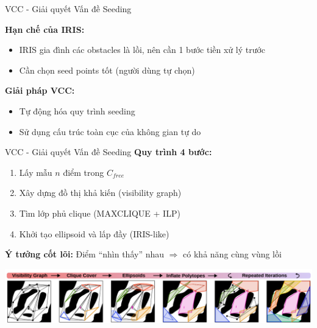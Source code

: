 \documentclass[aspectratio=169]{beamer}
\begin{document}
\begin{frame}{VCC - Giải quyết Vấn đề Seeding}

    \textbf{Hạn chế của IRIS:}
    \begin{itemize}
        \item IRIS gia đình các obstacles là lồi, nên cần 1 bước tiền xử lý trước
        \item Cần chọn seed points tốt (người dùng tự chọn)
    \end{itemize}

    \vspace{1em}
    \textbf{Giải pháp VCC:}
    \begin{itemize}
        \item Tự động hóa quy trình seeding
        \item Sử dụng cấu trúc toàn cục của không gian tự do
    \end{itemize}

\end{frame}

\begin{frame}{VCC - Giải quyết Vấn đề Seeding}
    \textbf{Quy trình 4 bước:}
    \begin{enumerate}
        \item Lấy mẫu $n$ điểm trong $C_{free}$
        \item Xây dựng đồ thị khả kiến (visibility graph)
        \item Tìm lớp phủ clique (MAXCLIQUE + ILP)
        \item Khởi tạo ellipsoid và lấp đầy (IRIS-like)
    \end{enumerate}

    \vspace{0.5em}
    \textbf{Ý tưởng cốt lõi:} Điểm ``nhìn thấy'' nhau $\Rightarrow$ có khả năng cùng vùng lồi

    \vspace{0.5em}
    \includegraphics[width=\textwidth]{../imgs/VCC.png}

\end{frame}
\end{document}
